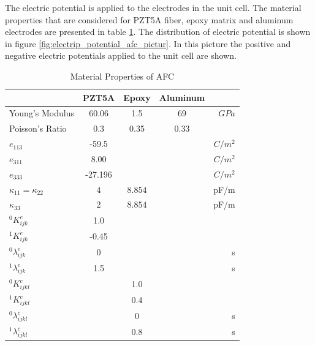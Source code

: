 The electric potential is applied to the electrodes in the unit cell.
The material properties that are considered for PZT5A fiber, epoxy matrix and aluminum electrodes are presented in table \ref{table:materila_properties_afc}.
The distribution of electric potential is shown in figure \ref{fig:electrip_potential_afc_pictur}.
In this picture the positive and negative electric potentials applied to the unit cell are shown.

\begin{table}
\caption{Material Properties of AFC}
\centering
\begin{tabular}{|l|c|c|c|r|}
\hline
               & PZT5A & Epoxy & Aluminum & \\ \hline 
Young's Modulus&60.06 & 1.5     & 69       &$GPa$    \\ \hline
Poisson's Ratio&$0.3$ & 0.35    & 0.33 &\\ \hline 
$e_{113}$      &-59.5 &         &      &$C/m^2$\\ \hline
$e_{311}$      &8.00&         &      &$C/m^2$\\ \hline
$e_{333}$      &-27.196  &         &      &$C/m^2$\\ \hline
$\kappa_{11}=\kappa_{22}$ &  $ 4  $ & $8.854  $ & &  pF/m \\ \hline
$\kappa_{33}$ & $2  $              & $8.854  $ & &  pF/m \\ \hline
${}^{0}K_{ijk}^{e}$&1.0& & &  \\ \hline
${}^{1}K_{ijk}^{e}$&-0.45& & & \\ \hline
${}^{0}\lambda_{ijk}^{e}$&0& & & s \\ \hline
${}^{1}\lambda_{ijk}^{e}$&1.5& & & s \\ \hline 
${}^{0}K_{ijkl}^{c}$& &1.0 & &  \\ \hline 
${}^{1}K_{ijkl}^{c}$& &0.4 & & \\ \hline
${}^{0}\lambda_{ijkl}^{c}$& &0&  & s\\ \hline
${}^{1}\lambda_{ijkl}^{c}$& &0.8 & & s \\ \hline 
\end{tabular}
\label{table:materila_properties_afc} 
\end{table}

